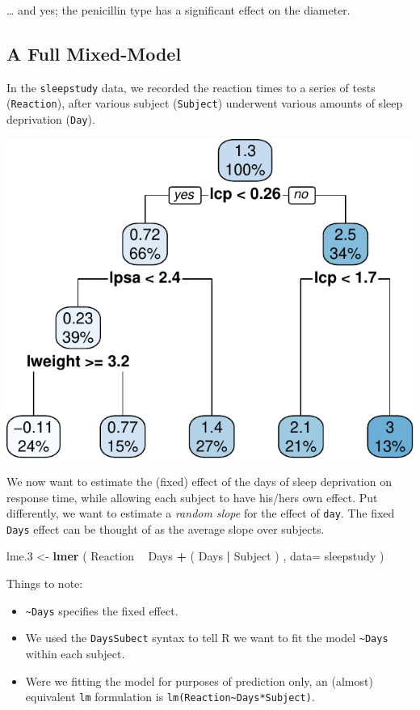 \documentclass[]{book}
\newenvironment{Shaded}{\begin{snugshade}}{\end{snugshade}}
\newcommand{\KeywordTok}[1]{\textcolor[rgb]{0.13,0.29,0.53}{\textbf{#1}}}
\newcommand{\DataTypeTok}[1]{\textcolor[rgb]{0.13,0.29,0.53}{#1}}
\newcommand{\DecValTok}[1]{\textcolor[rgb]{0.00,0.00,0.81}{#1}}
\newcommand{\StringTok}[1]{\textcolor[rgb]{0.31,0.60,0.02}{#1}}
\newcommand{\OperatorTok}[1]{\textcolor[rgb]{0.81,0.36,0.00}{\textbf{#1}}}
\newcommand{\NormalTok}[1]{#1}
\providecommand{\tightlist}{%
  \setlength{\itemsep}{0pt}\setlength{\parskip}{0pt}}
\theoremstyle{definition}
\theoremstyle{definition}
\theoremstyle{definition}
\theoremstyle{remark}
\begin{document}
\ldots{} and yes; the penicillin type has a significant effect on the
diameter.

\subsection{A Full Mixed-Model}\label{a-full-mixed-model}

In the \texttt{sleepstudy} data, we recorded the reaction times to a
series of tests (\texttt{Reaction}), after various subject
(\texttt{Subject}) underwent various amounts of sleep deprivation
(\texttt{Day}).

\includegraphics[width=0.5\linewidth]{Rcourse_files/figure-latex/unnamed-chunk-193-1}

We now want to estimate the (fixed) effect of the days of sleep
deprivation on response time, while allowing each subject to have
his/hers own effect. Put differently, we want to estimate a \emph{random
slope} for the effect of \texttt{day}. The fixed \texttt{Days} effect
can be thought of as the average slope over subjects.

\begin{Shaded}
\begin{Highlighting}[]
\NormalTok{lme.}\DecValTok{3}\NormalTok{ <-}\StringTok{ }\KeywordTok{lmer}\NormalTok{ ( Reaction }\OperatorTok{~}\StringTok{ }\NormalTok{Days }\OperatorTok{+}\StringTok{ }\NormalTok{( Days }\OperatorTok{|}\StringTok{ }\NormalTok{Subject ) , }\DataTypeTok{data=}\NormalTok{ sleepstudy )}
\end{Highlighting}
\end{Shaded}

Things to note:

\begin{itemize}
\tightlist
\item
  \texttt{\textasciitilde{}Days} specifies the fixed effect.
\item
  We used the \texttt{Days\textbar{}Subect} syntax to tell R we want to
  fit the model \texttt{\textasciitilde{}Days} within each subject.
\item
  Were we fitting the model for purposes of prediction only, an (almost)
  equivalent \texttt{lm} formulation is
  \texttt{lm(Reaction\textasciitilde{}Days*Subject)}.
\end{itemize}
\end{document}
